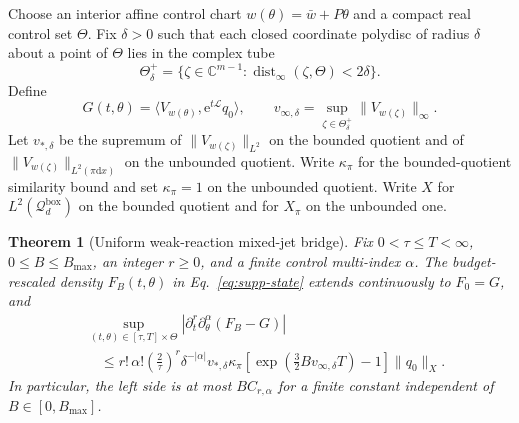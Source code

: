 \documentclass[aps,physrev,onecolumn,amsmath,amssymb,longbibliography]{revtex4-2}
\newcommand{\dd}{\mathrm d}
\newcommand{\e}{\mathrm e}
\newcommand{\Lfree}{\mathcal L}
\newcommand{\Qbox}{\mathcal Q_d^{\mathrm{box}}}
\newtheorem{theorem}{Theorem}[section]
\begin{document}
Choose an interior affine control chart \(w(\theta)=\bar w+P\theta\) and a
compact real control set \(\Theta\).  Fix \(\delta>0\) such that each closed
coordinate polydisc of radius \(\delta\) about a point of \(\Theta\) lies in
the complex tube
\begin{equation}
 \Theta_\delta^+
 =\{\zeta\in\mathbb C^{m-1}:
   \operatorname{dist}_\infty(\zeta,\Theta)<2\delta\}.
 \label{eq:supp-tube}
\end{equation}
Define
\begin{equation}
 G(t,\theta)=\langle V_{w(\theta)},\e^{t\Lfree}q_0\rangle,\qquad
 v_{\infty,\delta}=
 \sup_{\zeta\in\Theta_\delta^+}\|V_{w(\zeta)}\|_\infty .
 \label{eq:supp-free-exposure}
\end{equation}
Let \(v_{*,\delta}\) be the supremum of
\(\|V_{w(\zeta)}\|_{L^2}\) on the bounded quotient and of
\(\|V_{w(\zeta)}\|_{L^2(\pi\dd x)}\) on the unbounded quotient.  Write
\(\kappa_\pi\) for the bounded-quotient similarity bound and set
\(\kappa_\pi=1\) on the unbounded quotient.  Write \(X\) for
\(L^2(\Qbox)\) on the bounded quotient and for \(X_\pi\) on the unbounded
one.

\begin{theorem}[Uniform weak-reaction mixed-jet bridge]
\label{thm:mixed-jet}
Fix \(0<\tau\le T<\infty\), \(0\le B\le B_{\max}\), an integer \(r\ge0\),
and a finite control multi-index \(\alpha\).  The budget-rescaled density
\(F_B(t,\theta)\) in Eq.~\eqref{eq:supp-state} extends continuously to
\(F_0=G\), and
\begin{align}
 &\sup_{(t,\theta)\in[\tau,T]\times\Theta}
 \left|\partial_t^r\partial_\theta^\alpha(F_B-G)\right|
 \nonumber\\
 &\quad\le
 r!\,\alpha!\left(\frac2\tau\right)^r
 \delta^{-|\alpha|}v_{*,\delta}\kappa_\pi
 \left[\exp\!\left(\frac32Bv_{\infty,\delta}T\right)-1\right]
 \|q_0\|_X .
 \label{eq:supp-mixed-bound}
\end{align}
In particular, the left side is at most \(BC_{r,\alpha}\) for a finite
constant independent of \(B\in[0,B_{\max}]\).
\end{theorem}
\end{document}

